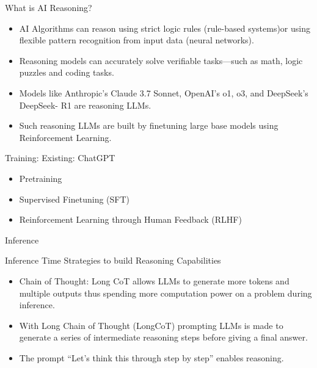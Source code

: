 \begin{frame}[fragile]{What is AI Reasoning?}
    \begin{itemize}
        \item AI Algorithms can reason using strict logic rules (rule-based systems)or using flexible 
pattern recognition from input data (neural networks). 
        \item Reasoning models can accurately solve verifiable tasks—such as math, logic puzzles and coding 
tasks.
        \item Models like Anthropic's Claude 3.7 Sonnet, OpenAI's o1, o3, and DeepSeek's DeepSeek- R1 
are reasoning LLMs. 
        \item Such reasoning LLMs are built by finetuning large base models using Reinforcement Learning.
    \end{itemize}
\end{frame}

\begin{frame}[fragile]{Training: Existing: ChatGPT}
    \begin{itemize}
        \item Pretraining 
        \item Supervised Finetuning (SFT)
        \item Reinforcement Learning through Human Feedback (RLHF)
    \end{itemize}
\end{frame}

\begin{frame}[fragile]{Inference}

Inference Time Strategies to build Reasoning Capabilities 

    \begin{itemize}
        \item  Chain of Thought: Long CoT allows LLMs to generate more tokens and multiple outputs thus spending more computation power on a problem during inference. 
        \item  With Long Chain of Thought (LongCoT) prompting LLMs is made to generate a series of intermediate reasoning steps before giving a final answer. 
        \item  The prompt ``Let's think this through step by step'' enables reasoning.
    \end{itemize}
\end{frame}


